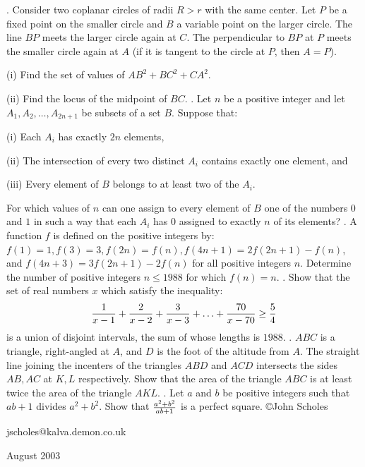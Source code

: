 \nopagenumbers
{}
\vskip 25pt
. Consider two coplanar circles of radii $R>r$ with the same center. Let $P$ be a fixed point on the smaller circle and $B$ a variable point on the larger circle. The line $BP$ meets the larger circle again at $C$. The perpendicular to $BP$ at $P$ meets the smaller circle again at $A$ (if it is tangent to the circle at $P$, then $A=P$).

(i) Find the set of values of $AB^2+BC^2+CA^2$.

(ii) Find the locus of the midpoint of $BC$.
\vskip 12pt
. Let $n$ be a positive integer and let $A_1,A_2,\ldots,A_{2n+1}$ be subsets of a set $B$. Suppose that:

(i) Each $A_i$ has exactly $2n$ elements,

(ii) The intersection of every two distinct $A_i$ contains exactly one element, and

(iii) Every element of $B$ belongs to at least two of the $A_i$.

\noindent For which values of $n$ can one assign to every element of $B$ one of the numbers $0$ and $1$ in such a way that each $A_i$ has $0$ assigned to exactly $n$ of its elements?
\vskip 12pt
. A function $f$ is defined on the positive integers by: $f(1)=1, f(3)=3, f(2n)=f(n),f(4n+1)=2f(2n+1)-f(n)$, and $f(4n+3)=3f(2n+1)-2f(n)$ for all positive integers $n$. Determine the number of positive integers $n\le1988$ for which $f(n)=n$.
\vskip 12pt
. Show that the set of real numbers $x$ which satisfy the inequality: $${1\over x-1}+{2\over x-2}+{3\over x-3}+\ldots+{70\over x-70}\ge{5\over4}$$ is a union of disjoint intervals, the sum of whose lengths is $1988$.
\vskip 12pt
. $ABC$ is a triangle, right-angled at $A$, and $D$ is the foot of the altitude from $A$. The straight line joining the incenters of the triangles $ABD$ and $ACD$ intersects the sides $AB,AC$ at $K,L$ respectively. Show that the area of the triangle $ABC$ is at least twice the area of the triangle $AKL$.
\vskip 12pt
. Let $a$ and $b$ be positive integers such that $ab+1$ divides $a^2+b^2$. Show that $a^2+b^2\over ab+1$ is a perfect square.
\vskip 20pt
\noindent \copyright John Scholes

\noindent jscholes@kalva.demon.co.uk

 August 2003

\bye
